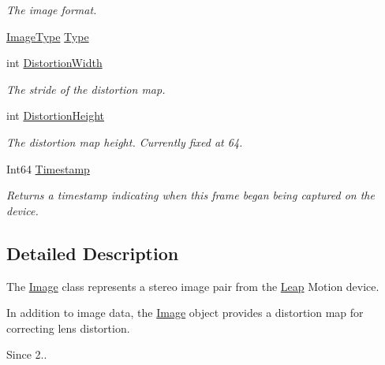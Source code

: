 \begin{DoxyCompactItemize}
\begin{DoxyCompactList}\small\item\em The image format. \end{DoxyCompactList}\item 
\mbox{\hyperlink{class_leap_1_1_image_a876a507d46b2dfce38d703a05cc4377f}{Image\+Type}} \mbox{\hyperlink{class_leap_1_1_image_abaa998d9eec529b2e69a0df4417502ee}{Type}}
\item 
int \mbox{\hyperlink{class_leap_1_1_image_a543d13baf55f8184ee5df4d8be7574fe}{Distortion\+Width}}
\begin{DoxyCompactList}\small\item\em The stride of the distortion map. \end{DoxyCompactList}\item 
int \mbox{\hyperlink{class_leap_1_1_image_a7221f670387ea10e1047a71b251000ea}{Distortion\+Height}}
\begin{DoxyCompactList}\small\item\em The distortion map height. Currently fixed at 64. \end{DoxyCompactList}\item 
Int64 \mbox{\hyperlink{class_leap_1_1_image_a984396ef2f504442b8d84a54430417c8}{Timestamp}}
\begin{DoxyCompactList}\small\item\em Returns a timestamp indicating when this frame began being captured on the device. \end{DoxyCompactList}\end{DoxyCompactItemize}


\subsection{Detailed Description}
The \mbox{\hyperlink{class_leap_1_1_image}{Image}} class represents a stereo image pair from the \mbox{\hyperlink{namespace_leap}{Leap}} Motion device. 

In addition to image data, the \mbox{\hyperlink{class_leap_1_1_image}{Image}} object provides a distortion map for correcting lens distortion. \begin{DoxySince}{Since}
2.. 
\end{DoxySince}


